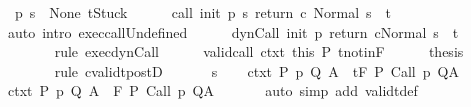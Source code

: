 \begin{isabellebody}
\ {\isachardoublequoteopen}{\isasymGamma}\ {\isacharparenleft}p\ s{\isacharparenright}\ {\isacharequal}\ None{\isachardoublequoteclose}\ {\isachardoublequoteopen}t{\isacharequal}Stuck{\isachardoublequoteclose}\isanewline
\ \ \ \ \isamarkupfalse%
\ {\isachardoublequoteopen}{\isasymGamma}{\isasymturnstile}{\isasymlangle}call\ init\ {\isacharparenleft}p\ s{\isacharparenright}\ return{\isacharprime}\ c\ {\isacharcomma}Normal\ s{\isasymrangle}\ {\isasymRightarrow}\ t{\isachardoublequoteclose}\isanewline
\ \ \ \ \ \ \isamarkupfalse%
\ {\isacharparenleft}auto\ intro{\isacharcolon}\ exec{\isacharunderscore}callUndefined{\isacharparenright}\isanewline
\ \ \ \ \isamarkupfalse%
\ {\isachardoublequoteopen}{\isasymGamma}{\isasymturnstile}{\isasymlangle}dynCall\ init\ p\ return{\isacharprime}\ c{\isacharcomma}Normal\ s{\isasymrangle}\ {\isasymRightarrow}\ t{\isachardoublequoteclose}\ \isanewline
\ \ \ \ \ \ \isamarkupfalse%
\ {\isacharparenleft}rule\ exec{\isacharunderscore}dynCall{\isacharparenright}\isanewline
\ \ \ \ \isamarkupfalse%
\ valid{\isacharunderscore}call\ ctxt\ this\ P\ t{\isacharunderscore}notin{\isacharunderscore}F\isanewline
\ \ \ \ \isamarkupfalse%
\ {\isacharquery}thesis\isanewline
\ \ \ \ \ \ \isamarkupfalse%
\ {\isacharparenleft}rule\ cvalidt{\isacharunderscore}postD{\isacharparenright}\isanewline
\ \ \isamarkupfalse%
\isanewline
{}\isamarkupfalse%
\isanewline
\ \ \isamarkupfalse%
\ s\isanewline
\ \ \isamarkupfalse%
\ ctxt{\isacharcolon}\ {\isachardoublequoteopen}{\isasymforall}{\isacharparenleft}P{\isacharcomma}\ p{\isacharcomma}\ Q{\isacharcomma}\ A{\isacharparenright}{\isasymin}{\isasymTheta}{\isachardot}\ {\isasymGamma}\ {\isasymTurnstile}\isactrlsub t\isactrlbsub {\isacharslash}F\isactrlesub \ P\ {\isacharparenleft}Call\ p{\isacharparenright}\ Q{\isacharcomma}A{\isachardoublequoteclose}\isanewline
\ \ \isamarkupfalse%
\ ctxt{\isacharprime}{\isacharcolon}\ {\isachardoublequoteopen}{\isasymforall}{\isacharparenleft}P{\isacharcomma}\ p{\isacharcomma}\ Q{\isacharcomma}\ A{\isacharparenright}{\isasymin}{\isasymTheta}{\isachardot}\ {\isasymGamma}\ {\isasymTurnstile}\isactrlbsub {\isacharslash}F\isactrlesub \ P\ {\isacharparenleft}Call\ p{\isacharparenright}\ Q{\isacharcomma}A{\isachardoublequoteclose}\ \isanewline
\ \ \ \ \isamarkupfalse%
\ {\isacharparenleft}auto\ simp\ add{\isacharcolon}\ validt{\isacharunderscore}def{\isacharparenright}\isanewline

\end{isabellebody}
